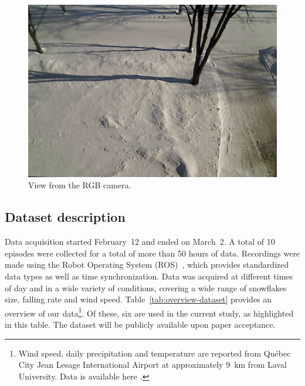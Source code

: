 \begin{figure}[th]
    \centering
    \includegraphics[width=0.90\linewidth]{./img/camera_view.jpg}
    \caption{View from the RGB camera.}
    \label{fig:view}
\end{figure}

\subsection{Dataset description}
Data acquisition started February~12 and ended on March~2. A total of 10 episodes were collected for a total of more than 50 hours of data. Recordings were made using the Robot Operating System (ROS)~\cite{ROSWeb}, which provides standardized data types as well as time synchronization. Data was acquired at different times of day and in a wide variety of conditions, covering a wide range of snowflakes size, falling rate and wind speed.  Table~\ref{tab:overview-dataset} provides an overview of our data\footnote{Wind speed, daily precipitation and temperature are reported from Québec City Jean Lesage International Airport at approximately \SI{9}{\km} from Laval University. Data is available here \cite{WeatherCanada}.}. Of these, six are used in the current study, as highlighted in this table. The dataset will be publicly available upon paper acceptance. %

